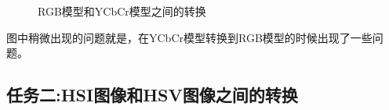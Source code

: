 \documentclass[UTF8,a4paper,10pt]{ctexart}
\begin{document}
\begin{flushleft}
\begin{figure}[htbp]
{            }%
            \caption{RGB模型和YCbCr模型之间的转换}
            \label{fig:fig_rgb_yuv}
        \end{figure}
        \hspace{2em}图中稍微出现的问题就是，在YCbCr模型转换到RGB模型的时候出现了一些问题。
        \subsection{任务二:HSI图像和HSV图像之间的转换}

\end{flushleft}
\end{document}
